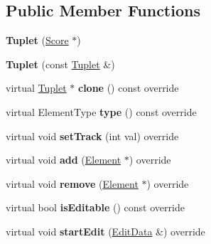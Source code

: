 \subsection*{Public Member Functions}
\begin{DoxyCompactItemize}
\item 
\mbox{\label{class_ms_1_1_tuplet_a74ee5c3a429ab651741f5d244b8b0458}} 
{\bfseries Tuplet} (\hyperlink{class_ms_1_1_score}{Score} $\ast$)
\item 
\mbox{\label{class_ms_1_1_tuplet_aa81d8f6b2c02f2deb6a4e37770dae784}} 
{\bfseries Tuplet} (const \hyperlink{class_ms_1_1_tuplet}{Tuplet} \&)
\item 
\mbox{\label{class_ms_1_1_tuplet_ab4bfc8c1566eaba0b2ba36366db1a555}} 
virtual \hyperlink{class_ms_1_1_tuplet}{Tuplet} $\ast$ {\bfseries clone} () const override
\item 
\mbox{\label{class_ms_1_1_tuplet_aeef8ad2cd8f8312ead9d46becaf5108e}} 
virtual Element\+Type {\bfseries type} () const override
\item 
\mbox{\label{class_ms_1_1_tuplet_a400fcfe66e74cf8f9444a5d269c7bfb0}} 
virtual void {\bfseries set\+Track} (int val) override
\item 
\mbox{\label{class_ms_1_1_tuplet_a9716464134a3d201dbbe52930d14d6fa}} 
virtual void {\bfseries add} (\hyperlink{class_ms_1_1_element}{Element} $\ast$) override
\item 
\mbox{\label{class_ms_1_1_tuplet_a499ca6d7a1cc0da91acd3d7385856172}} 
virtual void {\bfseries remove} (\hyperlink{class_ms_1_1_element}{Element} $\ast$) override
\item 
\mbox{\label{class_ms_1_1_tuplet_a6d212eb606417543746533583ba049c3}} 
virtual bool {\bfseries is\+Editable} () const override
\item 
\mbox{\label{class_ms_1_1_tuplet_ac2a4d190b709e89067ab77f103376ce6}} 
virtual void {\bfseries start\+Edit} (\hyperlink{class_ms_1_1_edit_data}{Edit\+Data} \&) override
\item 

\end{DoxyCompactItemize}
